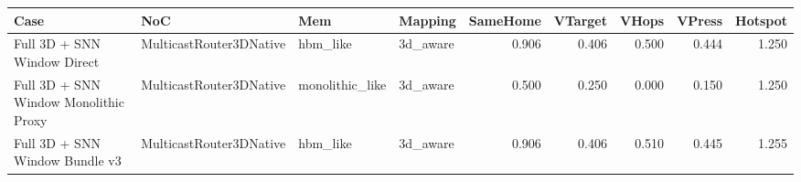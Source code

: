 \begin{tabular}{l l l l r r r r r}
\hline
Case & NoC & Mem & Mapping & SameHome & VTarget & VHops & VPress & Hotspot \\
\hline
Full 3D + SNN Window Direct & MulticastRouter3DNative & hbm\_like & 3d\_aware & 0.906 & 0.406 & 0.500 & 0.444 & 1.250 \\
Full 3D + SNN Window Monolithic Proxy & MulticastRouter3DNative & monolithic\_like & 3d\_aware & 0.500 & 0.250 & 0.000 & 0.150 & 1.250 \\
Full 3D + SNN Window Bundle v3 & MulticastRouter3DNative & hbm\_like & 3d\_aware & 0.906 & 0.406 & 0.510 & 0.445 & 1.255 \\
\hline
\end{tabular}
